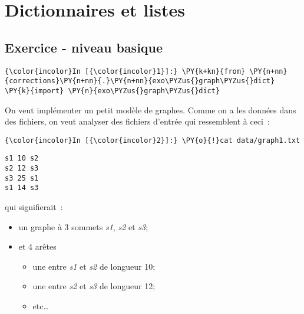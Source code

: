     
    
    
    

    

    \hypertarget{dictionnaires-et-listes}{%
\section{Dictionnaires et listes}\label{dictionnaires-et-listes}}

    \hypertarget{exercice---niveau-basique}{%
\subsection{Exercice - niveau basique}\label{exercice---niveau-basique}}

    \begin{Verbatim}[commandchars=\\\{\},frame=single,framerule=0.3mm,rulecolor=\color{cellframecolor}]
{\color{incolor}In [{\color{incolor}1}]:} \PY{k+kn}{from} \PY{n+nn}{corrections}\PY{n+nn}{.}\PY{n+nn}{exo\PYZus{}graph\PYZus{}dict} \PY{k}{import} \PY{n}{exo\PYZus{}graph\PYZus{}dict}
\end{Verbatim}


    On veut implémenter un petit modèle de graphes. Comme on a les données
dans des fichiers, on veut analyser des fichiers d'entrée qui
ressemblent à ceci~:

    \begin{Verbatim}[commandchars=\\\{\},frame=single,framerule=0.3mm,rulecolor=\color{cellframecolor}]
{\color{incolor}In [{\color{incolor}2}]:} \PY{o}{!}cat data/graph1.txt
\end{Verbatim}


    \begin{Verbatim}[commandchars=\\\{\},frame=single,framerule=0.3mm,rulecolor=\color{cellframecolor}]
s1 10 s2
s2 12 s3
s3 25 s1
s1 14 s3
\end{Verbatim}

    qui signifierait~:

\begin{itemize}
\tightlist
\item
  un graphe à 3 sommets \emph{s1}, \emph{s2} et \emph{s3};
\item
  et 4 arêtes

  \begin{itemize}
  \tightlist
  \item
    une entre \emph{s1} et \emph{s2} de longueur 10;
  \item
    une entre \emph{s2} et \emph{s3} de longueur 12;
  \item
    etc\ldots{}
  \end{itemize}
\end{itemize}


